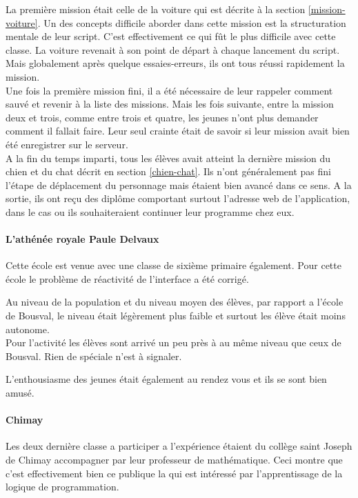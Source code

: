 La première mission était celle de la voiture qui est décrite à la section \ref{mission-voiture}. Un des concepts difficile aborder dans cette mission est la structuration mentale de leur script. C'est effectivement ce qui fût le plus difficile avec cette classe. La voiture revenait à son point de départ à chaque lancement du script. Mais globalement après quelque essaies-erreurs, ils ont tous réussi rapidement la mission.\\

Une fois la première mission fini, il a été nécessaire de leur rappeler comment sauvé et revenir à la liste des missions. Mais les fois suivante, entre la mission deux et trois, comme entre trois et quatre, les jeunes n'ont plus demander comment il fallait faire. Leur seul crainte était de savoir si leur mission avait bien été enregistrer sur le serveur.\\

A la fin du temps imparti, tous les élèves avait atteint la dernière mission du chien et du chat décrit en section \ref{chien-chat}. Ils n'ont généralement pas fini l'étape de déplacement du personnage mais étaient bien avancé dans ce sens. A la sortie, ils ont reçu des diplôme comportant surtout l'adresse web de l'application, dans le cas ou ils souhaiteraient continuer leur programme chez eux.

\paragraph{L'athénée royale Paule Delvaux}
Cette école est venue avec une classe de sixième primaire également. Pour cette école le problème de réactivité de l'interface a été corrigé.

Au niveau de la population et du niveau moyen des élèves, par rapport a l'école de Bousval, le niveau était légèrement plus faible et surtout les élève était moins autonome.\\

Pour l'activité les élèves sont arrivé un peu près à au même niveau que ceux de Bousval. Rien de spéciale n'est à signaler.

L'enthousiasme des jeunes était également au rendez vous et ils se sont bien amusé.

\paragraph{Chimay}
Les deux dernière classe a participer a l'expérience étaient du collège saint Joseph de Chimay accompagner par leur professeur de mathématique. Ceci montre que c'est effectivement bien ce publique la qui est intéressé par l'apprentissage de la logique de programmation.

